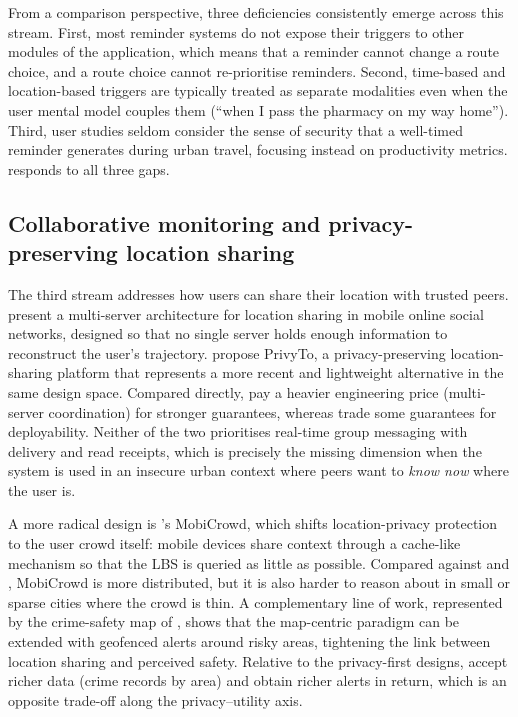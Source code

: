 \documentclass[a4paper,fleqn]{cas-sc}
\begin{document}
	From a comparison perspective, three deficiencies consistently emerge across this stream. First, most reminder systems do not expose their triggers to other modules of the application, which means that a reminder cannot change a route choice, and a route choice cannot re-prioritise reminders. Second, time-based and location-based triggers are typically treated as separate modalities even when the user mental model couples them (``when I pass the pharmacy on my way home''). Third, user studies seldom consider the sense of security that a well-timed reminder generates during urban travel, focusing instead on productivity metrics. \RUTAI{} responds to all three gaps.
	
	\subsection{Collaborative monitoring and privacy-preserving location sharing}\label{sec:rw-collab}
	
	The third stream addresses how users can share their location with trusted peers. \citet{li2017locsharing} present a multi-server architecture for location sharing in mobile online social networks, designed so that no single server holds enough information to reconstruct the user's trajectory. \citet{mckenzie2022privyto} propose PrivyTo, a privacy-preserving location-sharing platform that represents a more recent and lightweight alternative in the same design space. Compared directly, \citet{li2017locsharing} pay a heavier engineering price (multi-server coordination) for stronger guarantees, whereas \citet{mckenzie2022privyto} trade some guarantees for deployability. Neither of the two prioritises real-time group messaging with delivery and read receipts, which is precisely the missing dimension when the system is used in an insecure urban context where peers want to \emph{know now} where the user is.
	
	A more radical design is \citet{shokri2014mobicrowd}'s MobiCrowd, which shifts location-privacy protection to the user crowd itself: mobile devices share context through a cache-like mechanism so that the LBS is queried as little as possible. Compared against \citet{li2017locsharing} and \citet{mckenzie2022privyto}, MobiCrowd is more distributed, but it is also harder to reason about in small or sparse cities where the crowd is thin. A complementary line of work, represented by the crime-safety map of \citet{kim2025crimesafetymap}, shows that the map-centric paradigm can be extended with geofenced alerts around risky areas, tightening the link between location sharing and perceived safety. Relative to the privacy-first designs, \citet{kim2025crimesafetymap} accept richer data (crime records by area) and obtain richer alerts in return, which is an opposite trade-off along the privacy--utility axis.
	
\end{document}
